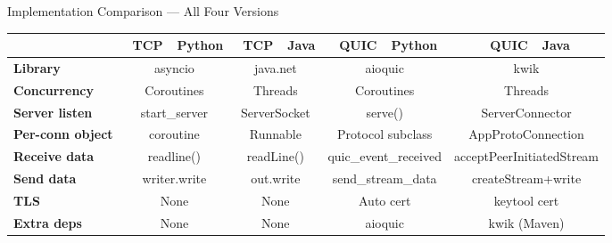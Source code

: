 \documentclass[aspectratio=169]{beamer}
\newcommand{\tcpbadge}{\colorbox{tcpcolor}{\color{white}\tiny\textbf{~TCP~}}}
\newcommand{\quicbadge}{\colorbox{quiccolor}{\color{white}\tiny\textbf{~QUIC~}}}
\begin{document}
\begin{frame}{Implementation Comparison --- All Four Versions}
  \centering\footnotesize
  \renewcommand{\arraystretch}{1.25}
  \begin{tabular}{>{\bfseries}l cccc}
    \toprule
    & \tcpbadge\ Python & \tcpbadge\ Java & \quicbadge\ Python & \quicbadge\ Java \\
    \midrule
    Library    & asyncio      & java.net    & aioquic        & kwik \\
    Concurrency & Coroutines  & Threads     & Coroutines     & Threads \\
    Server listen & start\_server & ServerSocket & serve()   & ServerConnector \\
    Per-conn object & coroutine & Runnable & Protocol subclass & AppProtoConnection \\
    Receive data & readline() & readLine() & quic\_event\_received & acceptPeerInitiatedStream \\
    Send data   & writer.write & out.write  & send\_stream\_data & createStream+write \\
    TLS         & None        & None        & Auto cert      & keytool cert \\
    Extra deps  & None        & None        & aioquic        & kwik (Maven) \\
    \bottomrule
  \end{tabular}
\end{frame}
\end{document}
